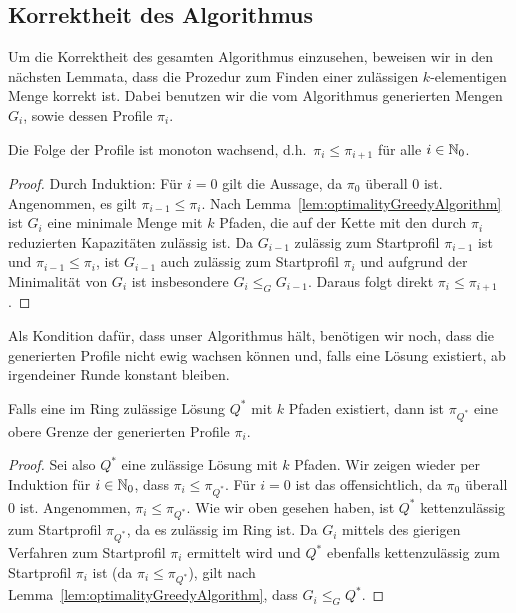 \subsection{Korrektheit des Algorithmus}\label{subsec:korrektheitCallControlInRings}
Um die Korrektheit des gesamten Algorithmus einzusehen, beweisen wir in den nächsten Lemmata, dass die Prozedur zum
Finden einer zulässigen $k$-elementigen Menge korrekt ist.
Dabei benutzen wir die vom Algorithmus generierten Mengen $G_i$, sowie dessen Profile $\pi_i$.

\begin{lemma}\label{lem:monotonousProfiles}
    Die Folge der Profile ist monoton wachsend, d.h.\ $\pi_i \leq \pi_{i+1}$ für alle $i \in \mathbb N_0$.
\end{lemma}
\begin{proof}
    Durch Induktion: Für $i=0$ gilt die Aussage, da $\pi_0$ überall 0 ist.
    Angenommen, es gilt $\pi_{i-1} \leq \pi_i$.
    Nach Lemma~\ref{lem:optimalityGreedyAlgorithm} ist $G_{i}$ eine minimale Menge mit $k$ Pfaden, die auf der Kette mit den durch $\pi_{i}$
    reduzierten Kapazitäten zulässig ist.
    Da $G_{i-1}$ zulässig zum Startprofil $\pi_{i-1}$ ist und $\pi_{i-1} \leq \pi_i$, ist $G_{i-1}$ auch
    zulässig zum Startprofil $\pi_{i}$ und aufgrund der Minimalität von $G_i$ ist insbesondere $G_i \leq_G G_{i-1}$.
    Daraus folgt direkt $\pi_i \leq \pi_{i+1}$.
\end{proof}

Als Kondition dafür, dass unser Algorithmus hält, benötigen wir noch, dass die generierten Profile nicht
ewig wachsen können und, falls eine Lösung existiert, ab irgendeiner Runde konstant bleiben.

\begin{lemma}\label{lem:upperBoundProfiles}
    Falls eine im Ring zulässige Lösung $Q^*$ mit $k$ Pfaden existiert, dann ist $\pi_{Q^*}$ eine obere Grenze der
    generierten Profile $\pi_i$.
\end{lemma}
\begin{proof}
    Sei also $Q^*$ eine zulässige Lösung mit $k$ Pfaden.
    Wir zeigen wieder per Induktion für $i \in \mathbb N_0$, dass $\pi_i \leq \pi_{Q^*}$.
    Für $i=0$ ist das offensichtlich, da $\pi_0$ überall 0 ist.
    Angenommen, $\pi_i \leq \pi_{Q^*}$.
    Wie wir oben gesehen haben, ist $Q^*$ kettenzulässig zum Startprofil $\pi_{Q^*}$, da es zulässig im Ring ist.
    Da $G_{i}$ mittels des gierigen Verfahren zum Startprofil $\pi_i$ ermittelt wird und $Q^*$ ebenfalls kettenzulässig
    zum Startprofil $\pi_i$ ist (da $\pi_i \leq \pi_{Q^*}$), gilt nach Lemma~\ref{lem:optimalityGreedyAlgorithm}, dass $G_{i} \leq_G Q^*$.
\end{proof}


